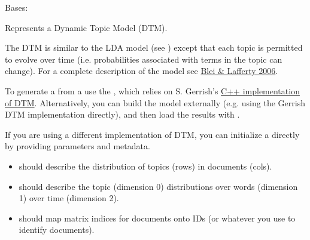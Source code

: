 \documentclass[letterpaper,10pt,english]{sphinxmanual}
\begin{document}
\begin{fulllineitems}
\label{tethne.model.corpus.dtmmodel:tethne.model.corpus.dtmmodel.DTMModel}
Bases: {\hyperref[tethne.model.basemodel:tethne.model.basemodel.BaseModel]{}}

Represents a Dynamic Topic Model (DTM).

The DTM is similar to the LDA model (see {\hyperref[tethne.model.corpus.ldamodel:tethne.model.corpus.ldamodel.LDAModel]{}}) except that
each topic is permitted to evolve over time (i.e. probabilities associated
with terms in the topic can change). For a complete description of the model
see \href{http://www.cs.cmu.edu/~lafferty/pub/dtm.pdf}{Blei \& Lafferty 2006}.

To generate a {\hyperref[tethne.model.corpus.dtmmodel:tethne.model.corpus.dtmmodel.DTMModel]{}} from a {\hyperref[tethne.classes.corpus:tethne.classes.corpus.Corpus]{}} use the
{\hyperref[tethne.model.managers.dtm:tethne.model.managers.dtm.DTMModelManager]{}}, which relies on S. Gerrish's \href{http://code.google.com/p/princeton-statistical-learning/downloads/detail?name=dtm\_release-0.8.tgz}{C++ implementation
of DTM}. Alternatively, you can build the
model externally (e.g. using the Gerrish DTM implementation directly), and
then load the results with {\hyperref[tethne.model.corpus.dtmmodel:tethne.model.corpus.dtmmodel.from_gerrish]{}}.

If you are using a different implementation of DTM, you can initialize a
{\hyperref[tethne.model.corpus.dtmmodel:tethne.model.corpus.dtmmodel.DTMModel]{}} directly by providing parameters and metadata.
\begin{itemize}
\item {} 
 should describe the distribution of topics (rows) in documents 
(cols).

\item {} 
 should describe the topic (dimension 0) distributions over words
(dimension 1) over time (dimension 2).

\item {} 
 should map matrix indices for documents onto {\hyperref[tethne.classes.paper:tethne.classes.paper.Paper]{}}
IDs (or whatever you use to identify documents).


\end{itemize}
\end{fulllineitems}
\end{document}
